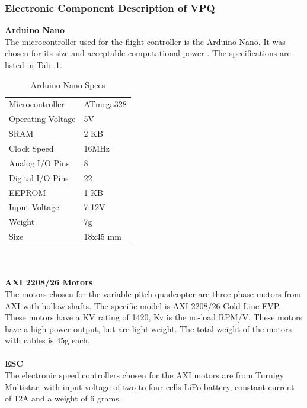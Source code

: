 
\subsubsection{Electronic Component Description of VPQ}

\textbf{Arduino Nano}\\
The microcontroller used for the flight controller is the Arduino Nano. It was chosen for its size and acceptable computational power \cite{Arduino}. The specifications are listed in Tab. \ref{tab:nanospecs}.

\begin{table}[H]
    \begin{center}
    \caption{Arduino Nano Specs} 
    \label{tab:nanospecs} 
        \begin{tabular}{|l|l|}
            \hline 
                Microcontroller & ATmega328\\
                Operating Voltage & 5V \\
                SRAM & 2 KB\\
                Clock Speed & 16MHz \\
                Analog I/O Pins & 8\\
                Digital I/O Pins & 22\\
                EEPROM & 1 KB\\
                Input Voltage & 7-12V\\
                Weight & 7g\\
                Size & 18x45 mm\\
            \hline
        \end{tabular}
    \end{center}
\end{table}
\\\\

\textbf{AXI 2208/26 Motors}\\
The motors chosen for the variable pitch quadcopter are three phase motors from AXI with hollow shafts. The specific model is AXI 2208/26 Gold Line EVP. These motors have a KV rating of 1420, Kv is the no-load RPM/V. These motors have a high power output, but are light weight. The total weight of the motors with cables is 45g each. 
\\\\

\textbf{ESC}\\
The electronic speed controllers chosen for the AXI motors are from Turnigy Multistar, with input voltage of two to four cells LiPo battery, constant current of 12A and a weight of 6 grams. 
\\\\

